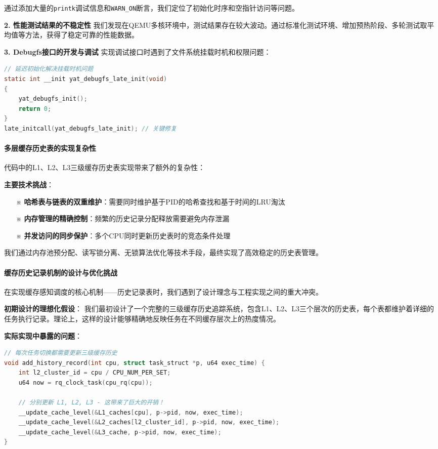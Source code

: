 通过添加大量的\texttt{printk}调试信息和\texttt{WARN\_ON}断言，我们定位了初始化时序和空指针访问等问题。

\textbf{2. 性能测试结果的不稳定性}
我们发现在QEMU多核环境中，测试结果存在较大波动。通过标准化测试环境、增加预热阶段、多轮测试取平均值等方法，获得了稳定可靠的性能数据。

\textbf{3. Debugfs接口的开发与调试}
实现调试接口时遇到了文件系统挂载时机和权限问题：

\begin{lstlisting}[language=C, basicstyle=\small\ttfamily]
// 延迟初始化解决挂载时机问题
static int __init yat_debugfs_late_init(void)
{
    yat_debugfs_init();
    return 0;
}
late_initcall(yat_debugfs_late_init); // 关键修复
\end{lstlisting}

\paragraph{多层缓存历史表的实现复杂性}

代码中的L1、L2、L3三级缓存历史表实现带来了额外的复杂性：

\textbf{主要技术挑战}：
\begin{itemize}
    \item[※] \textbf{哈希表与链表的双重维护}：需要同时维护基于PID的哈希查找和基于时间的LRU淘汰
    \item[※] \textbf{内存管理的精确控制}：频繁的历史记录分配释放需要避免内存泄漏
    \item[※] \textbf{并发访问的同步保护}：多个CPU同时更新历史表时的竞态条件处理
\end{itemize}

我们通过内存池预分配、读写锁分离、无锁算法优化等技术手段，最终实现了高效稳定的历史表管理。

\paragraph{缓存历史记录机制的设计与优化挑战}

在实现缓存感知调度的核心机制——历史记录表时，我们遇到了设计理念与工程实现之间的重大冲突。

\textbf{初期设计的理想化假设}：
我们最初设计了一个完整的三级缓存历史追踪系统，包含L1、L2、L3三个层次的历史表，每个表都维护着详细的任务执行记录。理论上，这样的设计能够精确地反映任务在不同缓存层次上的热度情况。

\textbf{实际实现中暴露的问题}：
\begin{lstlisting}[language=C, basicstyle=\small\ttfamily, caption={历史记录更新的复杂逻辑}]
// 每次任务切换都需要更新三级缓存历史
void add_history_record(int cpu, struct task_struct *p, u64 exec_time) {
    int l2_cluster_id = cpu / CPU_NUM_PER_SET;
    u64 now = rq_clock_task(cpu_rq(cpu));

    // 分别更新 L1, L2, L3 - 这带来了巨大的开销！
    __update_cache_level(&L1_caches[cpu], p->pid, now, exec_time);
    __update_cache_level(&L2_caches[l2_cluster_id], p->pid, now, exec_time);
    __update_cache_level(&L3_cache, p->pid, now, exec_time);
}
\end{lstlisting}

